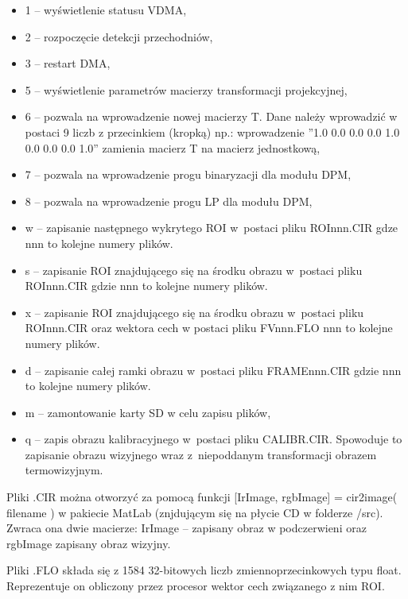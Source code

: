 \begin{itemize}
\item 1 -- wyświetlenie statusu VDMA,
\item 2 -- rozpoczęcie detekcji przechodniów,
\item 3 -- restart DMA,
\item 5 -- wyświetlenie parametrów macierzy transformacji projekcyjnej,
\item 6 -- pozwala na wprowadzenie nowej macierzy T. Dane należy wprowadzić w postaci 9 liczb z przecinkiem (kropką) np.: wprowadzenie ''1.0 0.0 0.0 0.0 1.0 0.0 0.0 0.0 1.0'' zamienia macierz T na macierz jednostkową,
\item 7 -- pozwala na wprowadzenie progu binaryzacji dla modułu DPM,
\item 8 -- pozwala na wprowadzenie progu LP dla modułu DPM,
\item w -- zapisanie następnego wykrytego ROI w~postaci pliku ROInnn.CIR gdze nnn to kolejne numery plików.
\item s -- zapisanie ROI znajdującego się na środku obrazu w~postaci pliku ROInnn.CIR gdzie nnn to kolejne numery plików.
\item x -- zapisanie ROI znajdującego się na środku obrazu w~postaci pliku ROInnn.CIR  oraz wektora cech w postaci pliku FVnnn.FLO nnn to kolejne numery plików.
\item d -- zapisanie całej ramki obrazu w~postaci pliku FRAMEnnn.CIR gdzie nnn to kolejne numery plików.
\item m -- zamontowanie karty SD w celu zapisu plików,
\item q -- zapis obrazu kalibracyjnego w~postaci pliku CALIBR.CIR. Spowoduje to zapisanie obrazu wizyjnego wraz z~niepoddanym transformacji obrazem termowizyjnym.
\end{itemize}

Pliki .CIR można otworzyć za pomocą funkcji [IrImage, rgbImage] = cir2image( filename ) w pakiecie MatLab (znjdującym się na płycie CD w folderze /src). Zwraca ona dwie macierze: IrImage -- zapisany obraz w podczerwieni oraz rgbImage zapisany obraz wizyjny.

Pliki .FLO składa się z 1584 32-bitowych liczb zmiennoprzecinkowych typu float. 
Reprezentuje on obliczony przez procesor wektor cech związanego z nim ROI.
